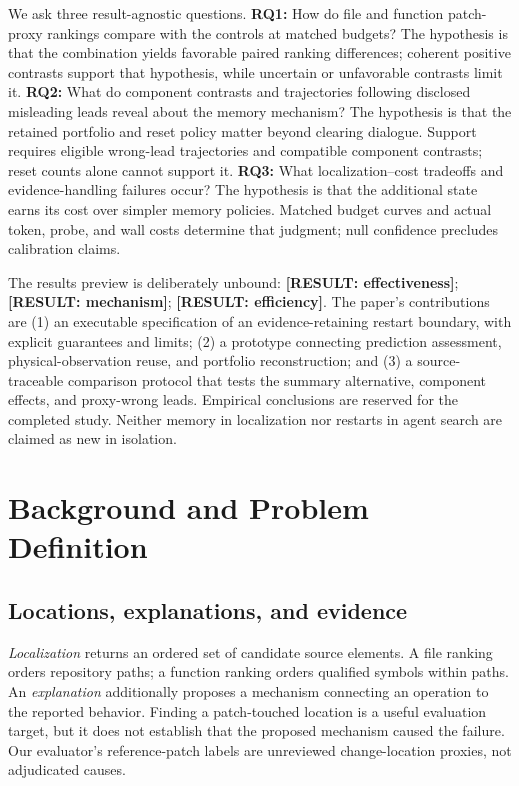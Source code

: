 \documentclass[letterpaper,journal]{IEEEtran}
\makeatletter
\newcommand{\resultslot}[1]{\textcolor{blue!65!black}{\textbf{[RESULT: #1]}}}
\newcommand{\claimslot}[1]{\resultslot{#1}}
\newcommand{\boundresult}[1]{\ifcsname result@#1\endcsname\csname result@#1\endcsname\else\PackageError{morph-results}{Missing result key #1}{Supply audited binding}\fi}
\newcommand{\claimslot}[1]{\boundresult{#1}}
\makeatother
\begin{document}
We ask three result-agnostic questions. \textbf{RQ1:} How do file and function patch-proxy rankings compare with the controls at matched budgets? The hypothesis is that the combination yields favorable paired ranking differences; coherent positive contrasts support that hypothesis, while uncertain or unfavorable contrasts limit it. \textbf{RQ2:} What do component contrasts and trajectories following disclosed misleading leads reveal about the memory mechanism? The hypothesis is that the retained portfolio and reset policy matter beyond clearing dialogue. Support requires eligible wrong-lead trajectories and compatible component contrasts; reset counts alone cannot support it. \textbf{RQ3:} What localization--cost tradeoffs and evidence-handling failures occur? The hypothesis is that the additional state earns its cost over simpler memory policies. Matched budget curves and actual token, probe, and wall costs determine that judgment; null confidence precludes calibration claims.

The results preview is deliberately unbound: \claimslot{effectiveness}; \claimslot{mechanism}; \claimslot{efficiency}. The paper's contributions are (1) an executable specification of an evidence-retaining restart boundary, with explicit guarantees and limits; (2) a prototype connecting prediction assessment, physical-observation reuse, and portfolio reconstruction; and (3) a source-traceable comparison protocol that tests the summary alternative, component effects, and proxy-wrong leads. Empirical conclusions are reserved for the completed study. Neither memory in localization nor restarts in agent search are claimed as new in isolation.

\section{Background and Problem Definition}\label{sec:background}
\subsection{Locations, explanations, and evidence}
\emph{Localization} returns an ordered set of candidate source elements. A file ranking orders repository paths; a function ranking orders qualified symbols within paths. An \emph{explanation} additionally proposes a mechanism connecting an operation to the reported behavior. Finding a patch-touched location is a useful evaluation target, but it does not establish that the proposed mechanism caused the failure. Our evaluator's reference-patch labels are unreviewed change-location proxies, not adjudicated causes.
\end{document}
